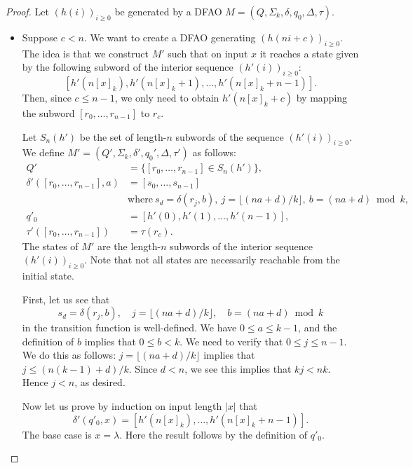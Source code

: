 \documentclass[12pt,reqno]{article}
\begin{document}
\begin{proof}
Let $(h(i))_{i \geq 0}$ be generated by a DFAO
$M=(Q, \Sigma_k, \delta, q_0, \Delta, \tau)$.
\begin{itemize}
    \item[(a)] Suppose $c < n$. We want to create a DFAO generating $(h(ni+c))_{i \geq 0}$. 
The idea is that we construct $M'$ such that on input $x$ it reaches a state given by the following subword of the interior sequence $(h'(i))_{i \geq 0}$:
    $$[h'(n[x]_k), h'(n[x]_k+1), \ldots, h'(n[x]_k+n-1)].$$
    Then, since $c \leq n-1$, we only need to obtain $h'(n[x]_k+c)$ by mapping the subword $[r_0, \ldots, r_{n-1}]$ to $r_c$.

    Let $S_n(h')$ be the set of length-$n$ subwords of the sequence $(h'(i))_{i \geq 0}$. We define $M'=(Q', \Sigma_k, \delta', q_0', \Delta, \tau')$ as follows:
    \begin{align*}
        Q' &= \{[r_0, \ldots, r_{n-1}] \in S_n(h')\}, \\
        \delta'([r_0, \ldots, r_{n-1}], a) &= [s_0, \ldots, s_{n-1}] \\ & \text{where} \ s_d = \delta(r_j,b), \ j = \lfloor (na+d)/k \rfloor, \ b = (na+d) \bmod k, \\
        q'_0 &= [h'(0), h'(1), \ldots, h'(n-1)],\\
        \tau'([r_0, \ldots, r_{n-1}]) &= \tau(r_c).
    \end{align*}
The states of $M'$ are the length-$n$ subwords of the interior sequence $(h'(i))_{i \geq 0}$.  Note that not all states are necessarily reachable from the initial state.

First, let us see that
\[
s_d = \delta(r_j,b), \quad j = \lfloor (na+d)/k \rfloor, \quad b = (na+d) \bmod k
\]
in the transition function is well-defined.   We have
$0 \leq a \leq k-1$, and the definition of $b$
implies that $0 \leq b < k$.
We need to verify that $0 \leq j \leq n-1$.  We do this as follows: 
$j = \lfloor (na+d)/k \rfloor$
implies that $j \leq (n(k-1)+d)/k$.
Since $d<n$, we see this implies that $kj < nk$.  Hence $j < n$,
as desired.

Now let us prove by induction on
input length $|x|$ that 
\begin{equation}
\delta'( q'_0, x) = 
[h'(n[x]_k), \ldots, h'(n[x]_k + n-1)].
\label{equation:h(ni+c)}
\end{equation}
The base case is $x = \lambda$. Here the result follows by the definition of $q'_0$.


\end{itemize}
\end{proof}
\end{document}
